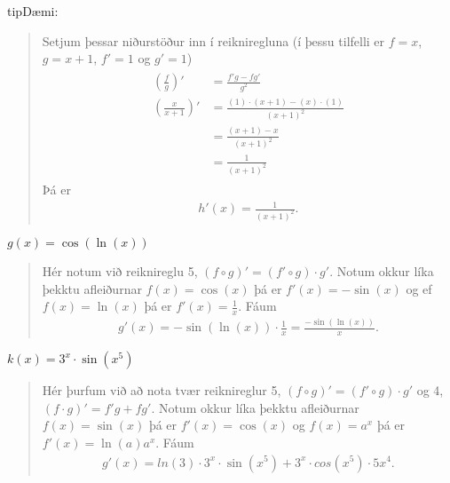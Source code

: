 \documentclass[a4paper,10pt,icelandic]{sphinxmanual}
\begin{document}
\begin{sphinxadmonition}{tip}{Dæmi:}
\begin{quote}
Setjum þessar niðurstöður inn í reikniregluna (í þessu tilfelli er \(f = x\), \(g = x+1\), \(f' = 1\) og \(g' = 1\))
\begin{equation*}
\begin{split}\begin{aligned}
   \left(\frac{f}{g}\right)' &=\frac{f'g-fg'}{g^2}\\
   (\frac{x}{x+1})' &= \frac{(1) \cdot (x+1) - (x) \cdot (1)}{(x+1)^2}\\
   &= \frac{(x+1)- x}{(x+1)^2} \\
   &= \frac{1}{(x+1)^2}
\end{aligned}\end{split}
\end{equation*}
Þá er
\begin{equation*}
\begin{split}h'(x)= \frac{1}{(x+1)^2}.\end{split}
\end{equation*}\end{quote}

 \(g(x) = \cos(\ln(x))\)
\begin{quote}

Hér notum við reiknireglu 5, \((f\circ g)'=(f'\circ g)\cdot g'\).
Notum okkur líka þekktu afleiðurnar \(f(x)=\cos(x)\) þá er \(f'(x)=-\sin(x)\) og ef \(f(x) = \ln(x)\) þá er \(f'(x) = \frac{1}{x}\). Fáum
\begin{equation*}
\begin{split}g'(x) = -\sin(\ln(x)) \cdot \frac{1}{x} = \frac{-\sin(\ln(x))}{x}.\end{split}
\end{equation*}\end{quote}

 \(k(x) = 3^x \cdot \sin(x^5)\)
\begin{quote}

Hér þurfum við að nota tvær reiknireglur 5, \((f\circ g)'=(f'\circ g)\cdot g'\) og 4, \((f\cdot g)'=f'g+fg'\). Notum okkur líka þekktu afleiðurnar \(f(x)=\sin(x)\) þá er \(f'(x)=\cos(x)\) og \(f(x)=a^x\) þá er \(f'(x)=\ln(a)a^x\). Fáum
\begin{equation*}
\begin{split}g'(x) = ln(3) \cdot 3^x \cdot \sin(x^5) + 3^x \cdot cos(x^5) \cdot 5x^4.\end{split}
\end{equation*}\end{quote}
\end{sphinxadmonition}
\end{document}
